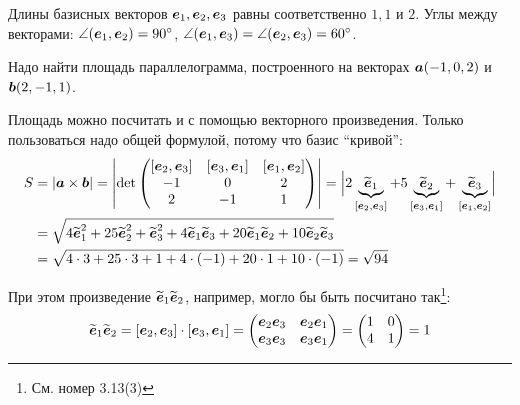 \documentclass[a4paper,12pt]{article}
\begin{document}
  \begin{problem}
    Длины базисных векторов $\boldsymbol e_1, \boldsymbol e_2, \boldsymbol e_3$ равны соответственно $1, 1$ и $2$.
    Углы между векторами: $\angle (\bds e_1, \bds e_2) \hm= 90\degree$, $\angle (\bds e_1, \bds e_3) \hm= \angle (\bds e_2, \bds e_3) \hm= 60\degree$.
    
    Надо найти площадь параллелограмма, построенного на векторах $\boldsymbol a (-1, 0, 2)$ и $\boldsymbol b (2, -1, 1)$.
  \end{problem}
  
  \begin{solution}
    Площадь можно посчитать и с помощью векторного произведения.
    Только пользоваться надо общей формулой, потому что базис ``кривой'':
    \begin{equation*}
    \begin{split}
      S &= |\bds a \times \bds b| = \left|
        \det \begin{pmatrix}
          [\bds e_2, \bds e_3] & [\bds e_3, \bds e_1] & [\bds e_1, \bds e_2]\\
          -1 & 0 & 2\\
          2 & -1 & 1
        \end{pmatrix}
      \right|
      = \Bigl|2 \underbrace{\widetilde{\bds e}_1}_{[\bds e_2, \bds e_3]}
        + 5 \underbrace{\widetilde{\bds e}_2}_{[\bds e_3, \bds e_1]}
        + \underbrace{\widetilde{\bds e}_3}_{[\bds e_1, \bds e_2]}\Bigr|\\  %
      &= \sqrt{4 \widetilde{\bds e}_1^2 + 25 \widetilde{\bds e}_2^2 + \widetilde{\bds e}_3^2 + 4 \widetilde{\bds e}_1 \widetilde{\bds e}_3 + 20 \widetilde{\bds e}_1 \widetilde{\bds e}_2 + 10 \widetilde{\bds e}_2 \widetilde{\bds e}_3}\\
      &= \sqrt{4 \cdot 3 + 25 \cdot 3 + 1 + 4 \cdot (-1) + 20 \cdot 1 + 10 \cdot (-1)} = \sqrt{94}
    \end{split}
    \end{equation*}
    
    При этом произведение $\widetilde{\boldsymbol e}_1 \widetilde{\boldsymbol e}_2$, например, могло бы быть посчитано так\footnote{См. номер 3.13(3)}:
    \[
      \widetilde{\boldsymbol e}_1 \widetilde{\boldsymbol e}_2 = [\boldsymbol e_2, \boldsymbol e_3] \cdot [\boldsymbol e_3, \boldsymbol e_1]
        = \begin{pmatrix}
          \boldsymbol e_2 \boldsymbol e_3 & \boldsymbol e_2 \boldsymbol e_1\\
          \boldsymbol e_3 \boldsymbol e_3 & \boldsymbol e_3 \boldsymbol e_1
        \end{pmatrix}
        = \begin{pmatrix}
          1 & 0\\
          4 & 1
        \end{pmatrix}
        = 1
    \]
  \end{solution}
  
\end{document}
